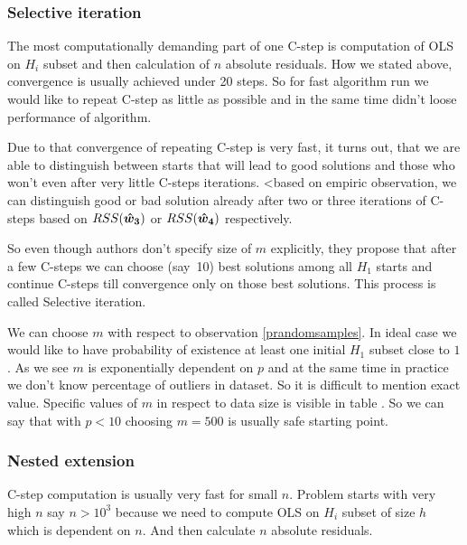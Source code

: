 \subsubsection{Selective iteration}
The most computationally demanding part of one C-step is computation of OLS on $H_i$ subset and then 
calculation of $n$ absolute residuals. How we stated above, convergence is usually achieved under 20 steps. 
So for fast algorithm run we would like to repeat C-step as little as possible and in the same time didn't loose performance of algorithm. 

Due to that convergence of repeating C-step is very fast, it turns out, that we are able to distinguish between starts that will lead to good solutions and those who won't even after very little C-steps iterations. <based on empiric observation, we can distinguish good or bad solution already after two or three iterations of C-steps based on $RSS(\boldsymbol{\hat{w}_3})$ or $RSS(\boldsymbol{\hat{w}_4})$ respectively. 

So even though authors don't specify size of $m$ explicitly, they propose that after a few C-steps we can choose (say~10) best solutions among all $H_1$ starts and continue C-steps till convergence only on those best solutions.
This process is called Selective iteration.

\begin{itshape}
	We can choose $m$ with respect to observation \ref{prandomsamples}. In ideal case we would like to have probability of existence at least one initial $H_1$ subset close to $1$. As we see $m$ is exponentially dependent on $p$ and at the same time in practice we don't know percentage of outliers in dataset. So it is difficult to mention exact value. Specific values of $m$ in respect to data size is visible in table . So we can say that with $p < 10$ choosing $m = 500$ is usually safe starting point.
\end{itshape}

\subsubsection{Nested extension}
C-step computation is usually very fast for small $n$. Problem starts with very high $n$ say $n > 10^3$ because we need to compute OLS on $H_i$ subset of size $h$ which is dependent on $n$. And then calculate $n$ absolute residuals.

